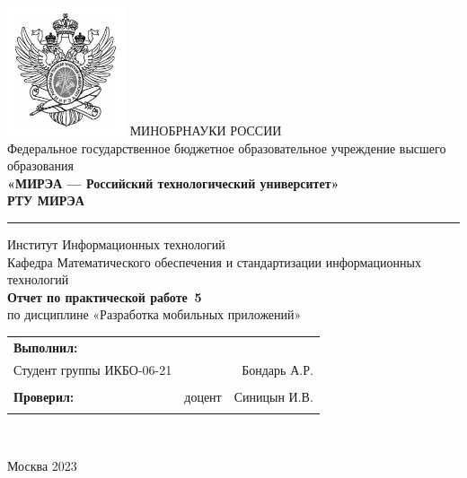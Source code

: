 \begin{center}
	\includegraphics[scale=0.5]{./res/logo} \break %
	\normalsize{МИНОБРНАУКИ РОССИИ}\\
	\normalsize{Федеральное государственное бюджетное образовательное учреждение высшего образования}\\
	\normalsize{\textbf{«МИРЭА --- Российский технологический университет»}}\\
	\large{\textbf{РТУ МИРЭА}}\\
	\bigskip \hrule \smallskip
	\normalsize{Институт Информационных технологий}\\
	\vfill
	\normalsize{Кафедра Математического обеспечения и стандартизации информационных технологий}\\
	\vfill
	\large{\textbf{Отчет по практической работе \No\,5}}\\
	\normalsize{по дисциплине «Разработка мобильных приложений»}\\
	\vfill
	\vfill
	\normalsize{
		\begin{tabular}{lrr}
			\textbf{Выполнил:} & &\\
			Студент группы ИКБО-06-21 & & Бондарь А.Р. \\\\
			\textbf{Проверил:} &  доцент & Синицын И.В. \\\\
		\end{tabular}
	}\\
	\vfill
\end{center}

\begin{center} Москва 2023 \end{center}

\thispagestyle{empty}
